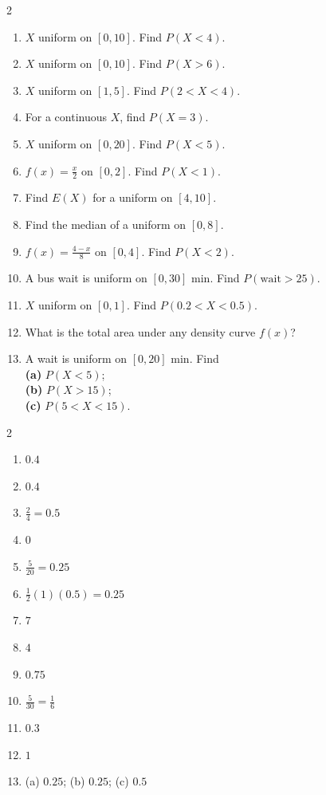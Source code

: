 \documentclass[11pt]{article}
\begin{document}
\clearpage
{}

\begin{recapbox}
\begin{multicols}{2}
\small
\begin{enumerate}[leftmargin=*,itemsep=3pt]
  \item $X$ uniform on $[0,10]$. Find $P(X<4)$.
  \item $X$ uniform on $[0,10]$. Find $P(X>6)$.
  \item $X$ uniform on $[1,5]$. Find $P(2<X<4)$.
  \item For a continuous $X$, find $P(X=3)$.
  \item $X$ uniform on $[0,20]$. Find $P(X<5)$.
  \item $f(x)=\tfrac{x}{2}$ on $[0,2]$. Find $P(X<1)$.
  \item Find $E(X)$ for a uniform on $[4,10]$.
  \item Find the median of a uniform on $[0,8]$.
  \item $f(x)=\tfrac{4-x}{8}$ on $[0,4]$. Find $P(X<2)$.
  \item A bus wait is uniform on $[0,30]$ min. Find $P(\text{wait}>25)$.
  \item $X$ uniform on $[0,1]$. Find $P(0.2<X<0.5)$.
  \item What is the total area under any density curve $f(x)$?
  \item A wait is uniform on $[0,20]$ min. Find \\ \textbf{(a)} $P(X<5)$; \\ \textbf{(b)} $P(X>15)$; \\ \textbf{(c)} $P(5<X<15)$.
\end{enumerate}
\end{multicols}
\end{recapbox}

\begin{keybox}
\begin{multicols}{2}
\small
\begin{enumerate}[leftmargin=*,itemsep=3pt]
  \item $0.4$
  \item $0.4$
  \item $\tfrac24=0.5$
  \item $0$
  \item $\tfrac{5}{20}=0.25$
  \item $\tfrac12(1)(0.5)=0.25$
  \item $7$
  \item $4$
  \item $0.75$
  \item $\tfrac{5}{30}=\tfrac16$
  \item $0.3$
  \item $1$
  \item (a) $0.25$; (b) $0.25$; (c) $0.5$
\end{enumerate}
\end{multicols}
\end{keybox}
\end{document}
